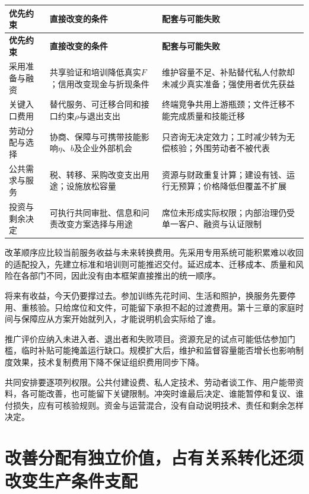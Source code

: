 \documentclass[UTF8,fontset=windows,12pt,a4paper,oneside,openany]{ctexbook}
\begin{document}
\begingroup\footnotesize\setlength{\tabcolsep}{4pt}\renewcommand{\arraystretch}{1.25}
\begin{longtable}{>{\raggedright\arraybackslash}p{}>{\raggedright\arraybackslash}p{}>{\raggedright\arraybackslash}p{}}
\toprule
\textbf{优先约束} & \textbf{直接改变的条件} & \textbf{配套与可能失败} \\
\midrule\endfirsthead
\toprule
\textbf{优先约束} & \textbf{直接改变的条件} & \textbf{配套与可能失败} \\
\midrule\endhead
\bottomrule\endfoot
采用准备与融资 & 共享验证和培训降低真实$F$；信用改变现金与折现条件 & 维护容量不足、补贴替代私人付款却未减少真实准备；强使用者优先获益 \\
关键入口费用 & 替代服务、可迁移合同和接口约束$\rho$与退出支出 & 终端竞争共用上游瓶颈；文件迁移不能完成质量和技能迁移 \\
劳动分配与选择 & 协商、保障与可携带技能影响$\eta$、$b$及企业外部机会 & 只咨询无决定效力；工时减少转为无偿核验；外围劳动者不被代表 \\
公共需求与服务 & 税、转移、采购改变支出用途；设施放松容量 & 资源与财政重复计算；建设有钱、运行无预算；价格降低但覆盖不扩展 \\
投资与剩余决定 & 可执行共同审批、信息和问责改变方案选择与用途 & 席位未形成实际权限；内部治理仍受单一客户、融资与认证限制 \\
\end{longtable}\endgroup


改革顺序应比较当前服务收益与未来转换费用。先采用专用系统可能积累难以收回的适配投入，先建立标准和培训则可能推迟交付。延迟成本、迁移成本、质量和风险在各部门不同，因此没有由本框架直接推出的统一顺序。

将来有收益，今天仍要撑过去。参加训练先花时间、生活和照护，换服务先要停用、重核验。只给席位和文件，可能留下承担不起的过渡费用。第十三章的家庭时间与保障应从方案开始就列入，才能说明机会实际给了谁。

推广评价应纳入未进入者、退出者和失败项目。资源充足的试点可能低估参加门槛，临时补贴可能掩盖运行缺口。规模扩大后，维护和监督容量能否增长也影响制度效果，技术复制费用下降不保证组织费用同步下降。

共同安排要逐项列权限。公共付建设费、私人定技术、劳动者谈工作、用户能带资料，各可能改善，也可能留下关键限制。冲突时谁最后决定、谁能暂停和复议、谁付损失，应有可核验规则。资金与运营混合，没有自动说明技术、责任和剩余怎样决定。

\section{改善分配有独立价值，占有关系转化还须改变生产条件支配}
\end{document}
